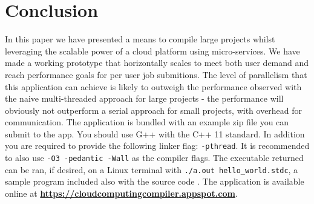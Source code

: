 \documentclass[conference]{IEEEtran}
\begin{document}
\section{Conclusion}
In this paper we have presented a means to compile large projects whilst
leveraging the scalable power of a cloud platform using micro-services. We have
made a working prototype that horizontally scales to
meet both user demand and reach performance goals for per user job submitions.
The level of parallelism that this application can achieve is likely to outweigh
the performance observed with the naive multi-threaded approach for large
projects - the performance will obviously not outperform a serial approach for
small projects, with overhead for communication.
The application is bundled with an example zip file \cite{Chimera} you can
submit to the app. You should use G++ with the C++ 11 standard. In addition you
are required to provide the following linker flag: \texttt{-pthread}. It is
recommended to also use \texttt{-O3 -pedantic -Wall} as the compiler flags. The
executable returned can be ran, if desired, on a Linux terminal with
\texttt{./a.out hello\_world.stdc}, a sample program included also with the
source code \cite{hellocloud}. The application is available online at
\textbf{\url{https://cloudcomputingcompiler.appspot.com}}.
\end{document}
